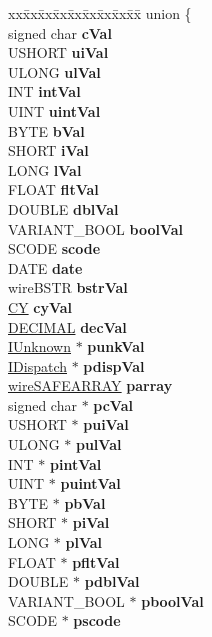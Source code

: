 \begin{DoxyCompactItemize}
\begin{tabbing}
xx\=xx\=xx\=xx\=xx\=xx\=xx\=xx\=xx\=\kill
union \{\\
\>signed char {\bfseries cVal}\\
\>USHORT {\bfseries uiVal}\\
\>ULONG {\bfseries ulVal}\\
\>INT {\bfseries intVal}\\
\>UINT {\bfseries uintVal}\\
\>BYTE {\bfseries bVal}\\
\>SHORT {\bfseries iVal}\\
\>LONG {\bfseries lVal}\\
\>FLOAT {\bfseries fltVal}\\
\>DOUBLE {\bfseries dblVal}\\
\>VARIANT\_BOOL {\bfseries boolVal}\\
\>SCODE {\bfseries scode}\\
\>DATE {\bfseries date}\\
\>wireBSTR {\bfseries bstrVal}\\
\>\hyperlink{uniontag_c_y}{CY} {\bfseries cyVal}\\
\>\hyperlink{structtag_d_e_c}{DECIMAL} {\bfseries decVal}\\
\>\hyperlink{interface_i_unknown}{IUnknown} $\ast$ {\bfseries punkVal}\\
\>\hyperlink{interface_i_dispatch}{IDispatch} $\ast$ {\bfseries pdispVal}\\
\>\hyperlink{struct_i_ole_automation_types_1_1__wire_s_a_f_e_a_r_r_a_y}{wireSAFEARRAY} {\bfseries parray}\\
\>signed char $\ast$ {\bfseries pcVal}\\
\>USHORT $\ast$ {\bfseries puiVal}\\
\>ULONG $\ast$ {\bfseries pulVal}\\
\>INT $\ast$ {\bfseries pintVal}\\
\>UINT $\ast$ {\bfseries puintVal}\\
\>BYTE $\ast$ {\bfseries pbVal}\\
\>SHORT $\ast$ {\bfseries piVal}\\
\>LONG $\ast$ {\bfseries plVal}\\
\>FLOAT $\ast$ {\bfseries pfltVal}\\
\>DOUBLE $\ast$ {\bfseries pdblVal}\\
\>VARIANT\_BOOL $\ast$ {\bfseries pboolVal}\\
\>SCODE $\ast$ {\bfseries pscode}\\

\end{tabbing}
\end{DoxyCompactItemize}
